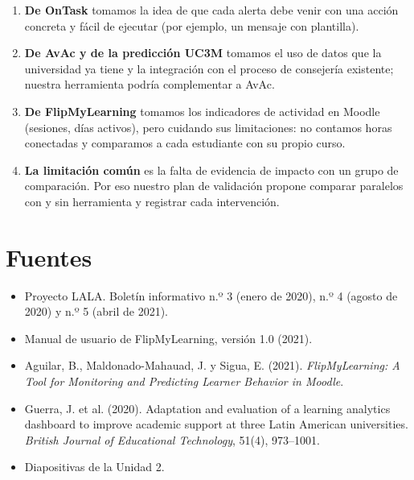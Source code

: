 \documentclass[10pt]{article}
\begin{document}
\begin{enumerate}
\item \textbf{De OnTask} tomamos la idea de que cada alerta debe venir con una acción concreta y fácil de ejecutar (por ejemplo, un mensaje con plantilla).
\item \textbf{De AvAc y de la predicción UC3M} tomamos el uso de datos que la universidad ya tiene y la integración con el proceso de consejería existente; nuestra herramienta podría complementar a AvAc.
\item \textbf{De FlipMyLearning} tomamos los indicadores de actividad en Moodle (sesiones, días activos), pero cuidando sus limitaciones: no contamos horas conectadas y comparamos a cada estudiante con su propio curso.
\item \textbf{La limitación común} es la falta de evidencia de impacto con un grupo de comparación. Por eso nuestro plan de validación propone comparar paralelos con y sin herramienta y registrar cada intervención.
\end{enumerate}

\section*{Fuentes}
\begin{itemize}
\item Proyecto LALA. Boletín informativo n.º 3 (enero de 2020), n.º 4 (agosto de 2020) y n.º 5 (abril de 2021).
\item Manual de usuario de FlipMyLearning, versión 1.0 (2021).
\item Aguilar, B., Maldonado-Mahauad, J. y Sigua, E. (2021). \emph{FlipMyLearning: A Tool for Monitoring and Predicting Learner Behavior in Moodle}.
\item Guerra, J. et al. (2020). Adaptation and evaluation of a learning analytics dashboard to improve academic support at three Latin American universities. \emph{British Journal of Educational Technology}, 51(4), 973--1001.
\item Diapositivas de la Unidad 2.
\end{itemize}
\end{document}
